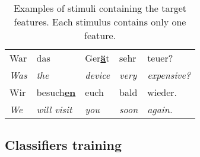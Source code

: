 %
\begin{table}[t]
	\centering
	\begin{tabularx}{\linewidth}{@{}*{5}{l}}
		\toprule
		
		War          	& das          			& Ger\textbf{\underline{ä}}t	& sehr          	& teuer? \\
		\emph{Was} 		& \emph{the} 			& \emph{device}           		& \emph{very} 		& \emph{expensive?} \\[0.3cm]
		
		
		Wir         	& besuch\textbf{\underline{en}} 						& euch				& bald          & wieder. \\
		\emph{We} 		& \emph{will visit}		& \emph{you} 					& \emph{soon} 		& \emph{again.} \\
		\bottomrule
	\end{tabularx}
	\caption[Example sentence for selected phonetic features]{Examples of stimuli containing the target features. Each stimulus contains only one feature.}
	\label{tab:target_features}
\end{table}

\subsection{Classifiers training}
\label{subsec:classifiers_training}

